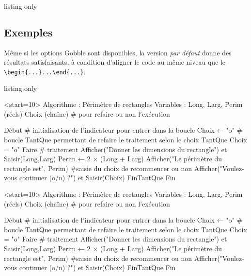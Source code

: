 \begin{PresCodeTexPL}{listing only}

	{\color{MotsClesPseudoCodeA}}

	{\color{MotsClesPseudoCodeB}}
\end{PresCodeTexPL}

\subsection{Exemples}

\begin{warningblock}
Même si les options \textsf{Gobble} sont disponibles, la version \textit{par défaut} donne des résultats satisfaisants, à condition d'aligner le code au même niveau que le \verb*|\begin{...}...\end{...}|.
\end{warningblock}

\begin{PresCodeTexPL}{listing only}
\begin{PseudoCodePiton}[Filigrane]{}<start=10>
Algorithme : Périmètre de rectangles
Variables  : Long, Larg, Perim (réels)
             Choix (chaîne) # pour refaire ou non l'exécution

Début
	# initialisation de l'indicateur pour entrer dans la boucle
	Choix ← "o"
	# boucle TantQue permettant de refaire le traitement selon le choix
	TantQue Choix = "o" Faire
		# traitement
		Afficher("Donner les dimensions du rectangle") et Saisir(Long,Larg)
		Perim ← 2 × (Long + Larg)
		Afficher("Le périmètre du rectangle est", Perim)
		#saisie du choix de recommencer ou non
		Afficher("Voulez-vous continuer (o/n) ?") et Saisir(Choix)
	FinTantQue
Fin
\end{PseudoCodePiton}
\end{PresCodeTexPL}

\begin{PseudoCodePiton}[Filigrane]{}<start=10>
Algorithme : Périmètre de rectangles
Variables  : Long, Larg, Perim (réels)
             Choix (chaîne) # pour refaire ou non l'exécution

Début
	# initialisation de l'indicateur pour entrer dans la boucle
	Choix ← "o"
	# boucle TantQue permettant de refaire le traitement selon le choix
	TantQue Choix = "o" Faire
		# traitement
		Afficher("Donner les dimensions du rectangle") et Saisir(Long,Larg)
		Perim ← 2 × (Long + Larg)
		Afficher("Le périmètre du rectangle est", Perim)
		#saisie du choix de recommencer ou non
		Afficher("Voulez-vous continuer (o/n) ?") et Saisir(Choix)
	FinTantQue
Fin
\end{PseudoCodePiton}

